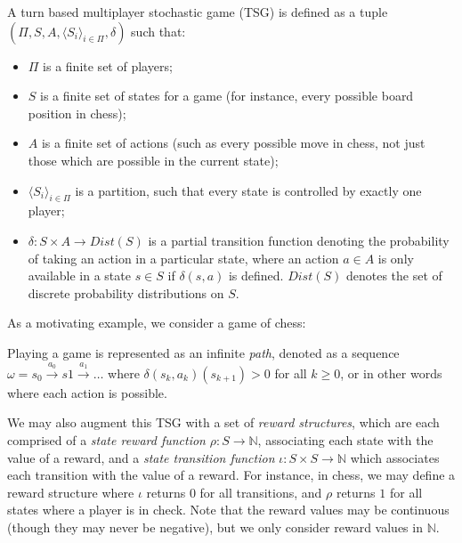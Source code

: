 \begin{definition}
    A turn based multiplayer stochastic game (TSG) is defined as a tuple $(\Pi, S, A, \langle S_i \rangle_{i \in \Pi}, \delta)$ such that:


    \begin{itemize}
        \item $\Pi$ is a finite set of players;
        \item $S$ is a finite set of states for a game (for instance, every possible board position in chess);
        \item $A$ is a finite set of actions (such as every possible move in chess, not just those which are possible in the current state);
        \item $\langle S_i \rangle_{i \in \Pi}$ is a partition, such that every state is controlled by exactly one player;
        \item $\delta : S \times A \rightarrow Dist(S)$ is a partial transition function denoting the probability of taking an action in a particular state, where an action $a \in A$ is only available in a state $s \in S$ if $\delta(s, a)$ is defined. $Dist(S)$ denotes the set of discrete probability distributions on $S$.
    \end{itemize} 
\end{definition}





As a motivating example, we consider a game of chess:



Playing a game is represented as an infinite \emph{path}, denoted as a sequence $\omega = s_0 \xrightarrow{a_0} s1 \xrightarrow{a_1} \dots$ where $\delta(s_k, a_k)(s_{k+1})>0$ for all $k\geq0$, or in other words where each action is possible.

We may also augment this TSG with a set of \emph{reward structures}, which are each comprised of a \emph{state reward function} $\rho : S \rightarrow \mathbb{N}$, associating each state with the value of a reward, and a \emph{state transition function} $\iota : S \times S \rightarrow \mathbb{N}$ which associates each transition with the value of a reward. For instance, in chess, we may define a reward structure where $\iota$ returns $0$ for all transitions, and $\rho$ returns $1$ for all states where a player is in check. Note that the reward values may be continuous (though they may never be negative), but we only consider reward values in $\mathbb{N}$.

